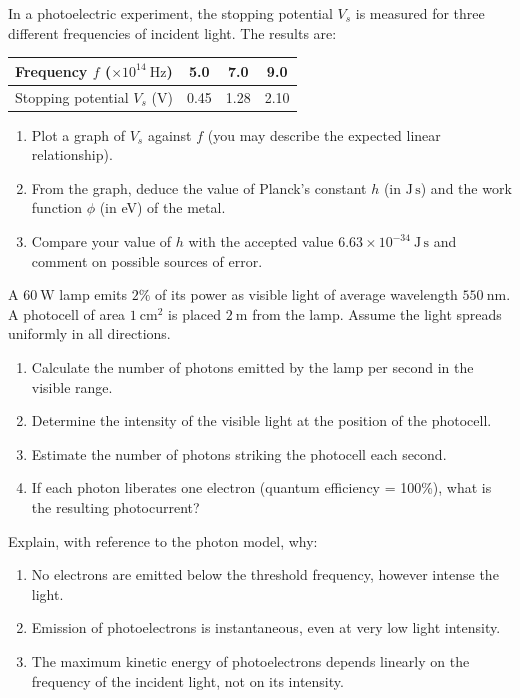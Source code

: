 \documentclass[11pt]{article}
\begin{document}
\begin{exercice}
In a photoelectric experiment, the stopping potential \(V_s\) is measured for three different frequencies of incident light. The results are:

\begin{center}
\begin{tabular}{|c|c|c|c|}
\hline
Frequency \(f\) (\(\times 10^{14}\ \mathrm{Hz}\)) & 5.0 & 7.0 & 9.0 \\
\hline
Stopping potential \(V_s\) (V) & 0.45 & 1.28 & 2.10 \\
\hline
\end{tabular}
\end{center}

\begin{enumerate}
\item Plot a graph of \(V_s\) against \(f\) (you may describe the expected linear relationship).
\item From the graph, deduce the value of Planck's constant \(h\) (in \(\mathrm{J\,s}\)) and the work function \(\phi\) (in eV) of the metal.
\item Compare your value of \(h\) with the accepted value \(6.63 \times 10^{-34}\ \mathrm{J\,s}\) and comment on possible sources of error.
\end{enumerate}
\end{exercice}

\begin{exercice}
A \(60\ \mathrm{W}\) lamp emits \(2\%\) of its power as visible light of average wavelength \(550\ \mathrm{nm}\). A photocell of area \(1\ \mathrm{cm}^2\) is placed \(2\ \mathrm{m}\) from the lamp. Assume the light spreads uniformly in all directions.
\begin{enumerate}
\item Calculate the number of photons emitted by the lamp per second in the visible range.
\item Determine the intensity of the visible light at the position of the photocell.
\item Estimate the number of photons striking the photocell each second.
\item If each photon liberates one electron (quantum efficiency = 100\%), what is the resulting photocurrent?
\end{enumerate}
\end{exercice}

\begin{exercice}
Explain, with reference to the photon model, why:
\begin{enumerate}
\item No electrons are emitted below the threshold frequency, however intense the light.
\item Emission of photoelectrons is instantaneous, even at very low light intensity.
\item The maximum kinetic energy of photoelectrons depends linearly on the frequency of the incident light, not on its intensity.
\end{enumerate}
\end{exercice}
\end{document}
